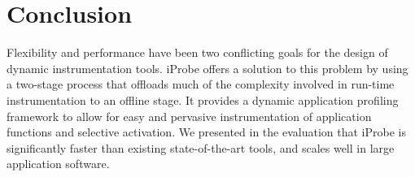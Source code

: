 \section{Conclusion}
\label{sec:conclusion}

Flexibility and performance have been two conflicting goals 
for the design of dynamic instrumentation tools.
iProbe offers a solution to this problem by using a two-stage process that offloads much of the complexity involved in run-time instrumentation to an offline stage. 
It provides a dynamic application profiling framework
to allow for easy and pervasive instrumentation of application functions
and selective activation. 
We presented in the evaluation that iProbe is significantly faster than existing state-of-the-art tools, and scales well in large application software.


